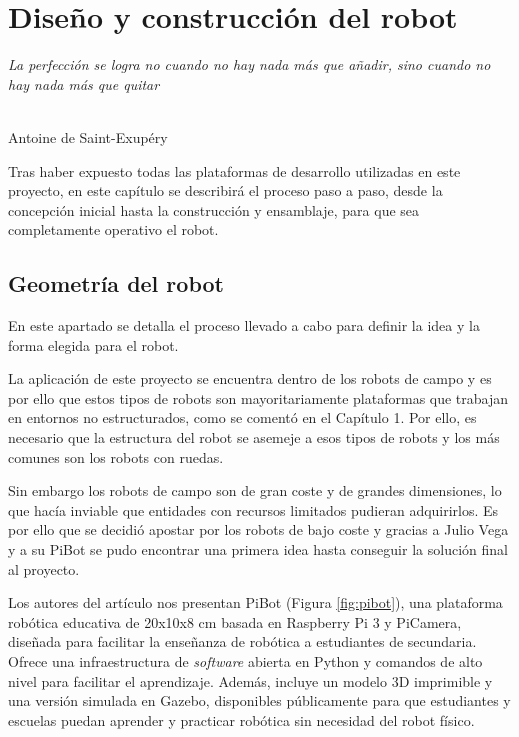 \chapter{Diseño y construcción del robot}
\label{cap:capitulo5}

\begin{flushright}
\begin{minipage}[]{10cm}
\emph{La perfección se logra no cuando no hay nada más que añadir, sino cuando no hay nada más que quitar}\\
\end{minipage}\\

Antoine de Saint-Exupéry\\
\end{flushright}

\vspace{1cm}

Tras haber expuesto todas las plataformas de desarrollo utilizadas en este proyecto, en este capítulo se describirá el proceso paso a paso, desde la concepción inicial hasta la construcción y ensamblaje, para que sea completamente operativo el robot.

\section{Geometría del robot}

En este apartado se detalla el proceso llevado a cabo para definir la idea y la forma elegida para el robot.

La aplicación de este proyecto se encuentra dentro de los robots de campo y es por ello que estos tipos de robots son mayoritariamente plataformas que trabajan en entornos no estructurados, como se comentó en el Capítulo 1. Por ello, es necesario que la estructura del robot se asemeje a esos tipos de robots y los más comunes son los robots con ruedas. 

Sin embargo los robots de campo son de gran coste y de grandes dimensiones, lo que hacía inviable que entidades con recursos limitados pudieran adquirirlos. Es por ello que se decidió apostar por los robots de bajo coste y gracias a Julio Vega y a su PiBot se pudo encontrar una primera idea hasta conseguir la solución final al proyecto. 

Los autores del artículo \cite{vega18c} nos presentan PiBot (Figura \ref{fig:pibot}), una plataforma robótica educativa  de 20x10x8 cm basada en Raspberry Pi 3 y PiCamera, diseñada para facilitar la enseñanza de robótica a estudiantes de secundaria. Ofrece una infraestructura de \textit{software} abierta en Python y comandos de alto nivel para facilitar el aprendizaje. Además, incluye un modelo 3D imprimible y una versión simulada en Gazebo, disponibles públicamente para que estudiantes y escuelas puedan aprender y practicar robótica sin necesidad del robot físico. 

